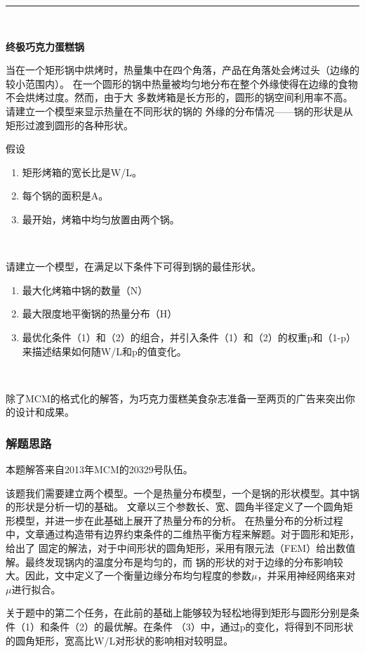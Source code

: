 \documentclass[bwprint]{cumcmthesis}
\begin{document}
\begin{shaded}
\noindent\rule{\textwidth}{0.1mm}
\normalsize\ 
\begin{center}
\textbf{终极巧克力蛋糕锅}
\end{center}

\small\noindent 
当在一个矩形锅中烘烤时，热量集中在四个角落，产品在角落处会烤过头（边缘的较小范围内）。
在一个圆形的锅中热量被均匀地分布在整个外缘使得在边缘的食物不会烘烤过度。然而，由于大
多数烤箱是长方形的，圆形的锅空间利用率不高。请建立一个模型来显示热量在不同形状的锅的
外缘的分布情况——锅的形状是从矩形过渡到圆形的各种形状。\newline

\noindent 假设
\begin{enumerate}
\item 矩形烤箱的宽长比是W/L。
\item 每个锅的面积是A。
\item 最开始，烤箱中均匀放置由两个锅。
\end{enumerate}\ 

\noindent 请建立一个模型，在满足以下条件下可得到锅的最佳形状。
\begin{enumerate}
\item 最大化烤箱中锅的数量（N）
\item 最大限度地平衡锅的热量分布（H）
\item 最优化条件（1）和（2）的组合，并引入条件（1）和（2）的权重p和（1-p）来描述结果如何随W/L和p的值变化。
\end{enumerate}\ 

\noindent 除了MCM的格式化的解答，为巧克力蛋糕美食杂志准备一至两页的广告来突出你的设计和成果。
\end{shaded}

\subsubsection{解题思路}

本题解答来自2013年MCM的20329号队伍。

该题我们需要建立两个模型。一个是热量分布模型，一个是锅的形状模型。其中锅的形状是分析一切的基础。
文章以三个参数长、宽、圆角半径定义了一个圆角矩形模型，并进一步在此基础上展开了热量分布的分析。
在热量分布的分析过程中，文章通过构造带有边界约束条件的二维热平衡方程来解题。对于圆形和矩形，给出了
固定的解法，对于中间形状的圆角矩形，采用有限元法（FEM）给出数值解。最终发现锅内的温度分布是均匀的，而
锅的形状的对于边缘的分布影响较大。因此，文中定义了一个衡量边缘分布均匀程度的参数$\mu$，并采用神经网络来对
$\mu$进行拟合。

关于题中的第二个任务，在此前的基础上能够较为轻松地得到矩形与圆形分别是条件（1）和条件（2）的最优解。在条件
（3）中，通过p的变化，将得到不同形状的圆角矩形，宽高比W/L对形状的影响相对较明显。
\end{document}
